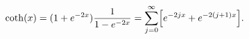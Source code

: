 \begin{equation}
{\rm coth} (x) = (1+  e^{-2x}) \frac{1}{1 - e^{-2x}} = 
\sum_{j = 0}^{\infty} \Bigl[e^{- 2j x} + e^{- 2 (j+1)x} \Bigr].
\end{equation}

